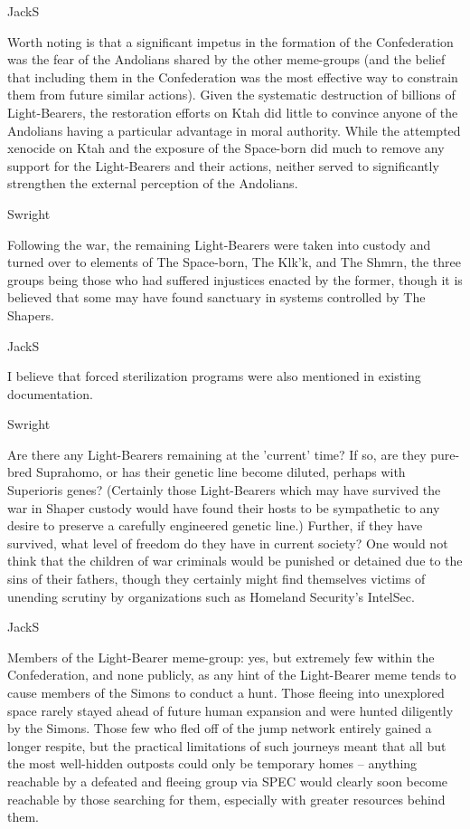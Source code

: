 JackS
	
Worth noting is that a significant impetus in the formation of the
Confederation was the fear of the Andolians shared by the other
meme-groups (and the belief that including them in the Confederation
was the most effective way to constrain them from future similar
actions). Given the systematic destruction of billions of
Light-Bearers, the restoration efforts on Ktah did little to convince
anyone of the Andolians having a particular advantage in moral
authority. While the attempted xenocide on Ktah and the exposure of
the Space-born did much to remove any support for the Light-Bearers
and their actions, neither served to significantly strengthen the
external perception of the Andolians.

Swright

Following the war, the remaining Light-Bearers were taken into custody
and turned over to elements of The Space-born, The Klk'k, and The
Shmrn, the three groups being those who had suffered injustices
enacted by the former, though it is believed that some may have found
sanctuary in systems controlled by The Shapers.

JackS

I believe that forced sterilization programs were also mentioned in
existing documentation.

Swright

Are there any Light-Bearers remaining at the 'current' time? If so,
are they pure-bred Suprahomo, or has their genetic line become
diluted, perhaps with Superioris genes? (Certainly those Light-Bearers
which may have survived the war in Shaper custody would have found
their hosts to be sympathetic to any desire to preserve a carefully
engineered genetic line.) Further, if they have survived, what level
of freedom do they have in current society? One would not think that
the children of war criminals would be punished or detained due to the
sins of their fathers, though they certainly might find themselves
victims of unending scrutiny by organizations such as Homeland
Security's IntelSec.

JackS
	
Members of the Light-Bearer meme-group: yes, but extremely few within
the Confederation, and none publicly, as any hint of the Light-Bearer
meme tends to cause members of the Simons to conduct a hunt. Those
fleeing into unexplored space rarely stayed ahead of future human
expansion and were hunted diligently by the Simons. Those few who fled
off of the jump network entirely gained a longer respite, but the
practical limitations of such journeys meant that all but the most
well-hidden outposts could only be temporary homes -- anything
reachable by a defeated and fleeing group via SPEC would clearly soon
become reachable by those searching for them, especially with greater
resources behind them.

